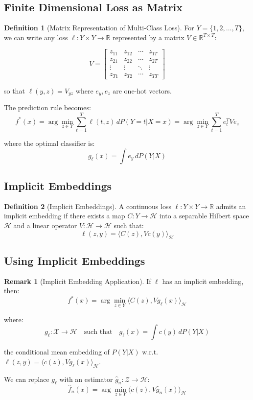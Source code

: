 \documentclass[12pt,a4paper]{article}
\theoremstyle{definition}
\newtheorem{definition}{Definition}[section]
\newtheorem{remark}{Remark}[section]
\begin{document}
\subsection{Finite Dimensional Loss as Matrix}

\begin{definition}[Matrix Representation of Multi-Class Loss]
For $Y = \{1, 2, \ldots, T\}$, we can write any loss $\ell : Y \times Y \to \mathbb{R}$ represented by a matrix $V \in \mathbb{R}^{T \times T}$:

\[
V = \begin{bmatrix} z_{11} & z_{12} & \cdots & z_{1T} \\ z_{21} & z_{22} & \cdots & z_{2T} \\ \vdots & \vdots & \ddots & \vdots \\ z_{T1} & z_{T2} & \cdots & z_{TT} \end{bmatrix}
\]

so that $\ell(y, z) = V_{yz}$ where $e_y, e_z$ are one-hot vectors.

The prediction rule becomes:
\[
f^*(x) = \arg\min_{z \in Y} \sum_{t=1}^T \ell(t, z) \, dP(Y=t|X=x) = \arg\min_{z \in Y} \sum_{t=1}^T e_t^T V e_z
\]

where the optimal classifier is:
\[
g_\ell(x) = \int e_y \, dP(Y|X)
\]
\end{definition}

\subsection{Implicit Embeddings}

\begin{definition}[Implicit Embeddings]
A continuous loss $\ell: Y \times Y \to \mathbb{R}$ admits an implicit embedding if there exists a map $C: Y \to \mathcal{H}$ into a separable Hilbert space $\mathcal{H}$ and a linear operator $V: \mathcal{H} \to \mathcal{H}$ such that:
\[
\ell(z, y) = \langle C(z), V c(y) \rangle_\mathcal{H}
\]
\end{definition}

\subsection{Using Implicit Embeddings}

\begin{remark}[Implicit Embedding Application]
If $\ell$ has an implicit embedding, then:
\[
f^*(x) = \arg\min_{z \in Y} \langle C(z), V g_\ell(x) \rangle_\mathcal{H}
\]

where:
\[
g_\ell : \mathcal{X} \to \mathcal{H} \quad \text{such that} \quad g_\ell(x) = \int c(y) \, dP(Y|X)
\]

the conditional mean embedding of $P(Y|X)$ w.r.t. $\ell(z,y) = \langle c(z), V g_\ell(x) \rangle_\mathcal{H}$.

We can replace $g_\ell$ with an estimator $\hat{g}_n: \mathcal{Z} \to \mathcal{H}$:
\[
\hat{f}_n(x) = \arg\min_{z \in Y} \langle c(z), V \hat{g}_n(x) \rangle_\mathcal{H}
\]
\end{remark}
\end{document}
